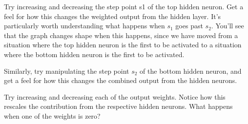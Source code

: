 \documentclass[a4paper,twoside,10pt]{book}
\begin{document}
Try increasing and decreasing the step point s1 of the top hidden neuron. Get a feel for how this changes the weighted output from the hidden layer. It's particularly worth understanding what happens when $s_1$ goes past $s_2$. You'll see that the graph changes shape when this happens, since we have moved from a situation where the top hidden neuron is the first to be activated to a situation where the bottom hidden neuron is the first to be activated.

Similarly, try manipulating the step point $s_2$ of the bottom hidden neuron, and get a feel for how this changes the combined output from the hidden neurons.

Try increasing and decreasing each of the output weights. Notice how this rescales the contribution from the respective hidden neurons. What happens when one of the weights is zero?
\end{document}
